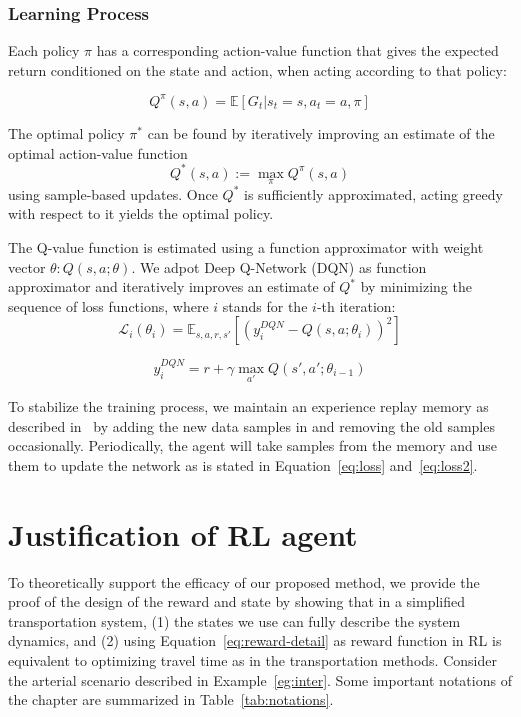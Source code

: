 \subsubsection{Learning Process}

Each policy $\pi$ has a corresponding action-value function that gives the expected return conditioned on the state and action, when acting according to that policy:

\begin{equation}
Q^\pi(s,a) = \mathbb{E}[G_t|s_t=s,a_t=a,\pi]
\end{equation}

The optimal policy $\pi^*$ can be found by iteratively improving an estimate of the optimal action-value function
\begin{equation}
\label{eq:q_max}
Q^*(s, a) := \max_\pi Q^\pi(s, a)
\end{equation}
using sample-based updates. Once $Q^*$
is sufficiently approximated, acting greedy with respect to it yields the optimal policy.

The Q-value function is estimated using a function approximator with weight vector $\theta: Q(s, a; \theta)$. We adpot Deep Q-Network (DQN) as function approximator and iteratively improves an estimate of $Q^*$ by minimizing the sequence of loss functions, where $i$ stands for the $i$-th iteration:
\begin{equation}
\label{eq:loss}
\mathcal{L}_i(\theta_i) = \mathbb{E}_{s,a,r,s'}[(y_i^{DQN}-Q(s,a;\theta_i))^2]
\end{equation}

\begin{equation}
\label{eq:loss2}
y_i^{DQN}=r+\gamma\max_{a'}Q(s',a';\theta_{i-1})
\end{equation}

To stabilize the training process, we maintain an experience replay memory as described in~\cite{MKSR+15} by adding the new data samples in and removing the old samples occasionally. Periodically, the agent will take samples from the memory and use them to update the network as is stated in Equation~\ref{eq:loss} and~\ref{eq:loss2}. 


\section{Justification of RL agent}
To theoretically support the efficacy of our proposed method, we provide the proof of the design of the reward and state by showing that in a simplified transportation system,
(1) the states we use can fully describe the system dynamics, and (2) using Equation~\ref{eq:reward-detail} as reward function in RL is equivalent to optimizing travel time as in the transportation methods.
Consider the arterial scenario described in Example~\ref{eg:inter}.
Some important notations of the chapter are summarized in Table~\ref{tab:notations}.

